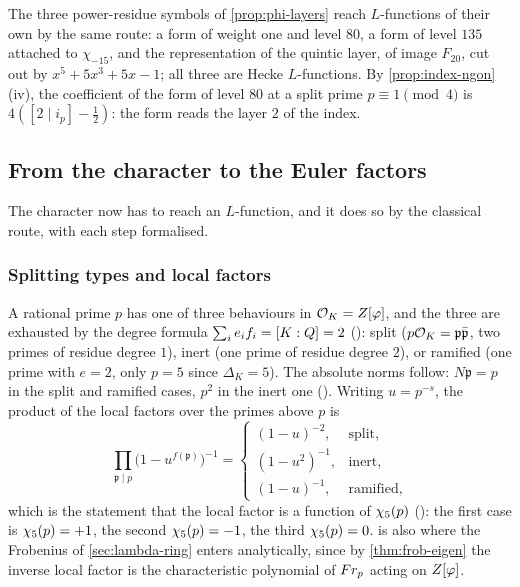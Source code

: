 \begin{remark}\label{rmk:layers-L}
The three power-residue symbols of \cref{prop:phi-layers} reach
$L$-functions of their own by the same route:
a form of weight one and level $80$, a form of level
$135$ attached to $\chi_{-15}$, and the
representation of the quintic layer, of image $F_{20}$,
cut out by $x^5+5x^3+5x-1$; all three are Hecke
$L$-functions.  By \cref{prop:index-ngon}(iv), the
coefficient of the form of level $80$ at a split prime
$p\equiv1\pmod4$ is $4([2\mid i_p]-\tfrac12)$: the form reads
the layer $2$ of the index.
\end{remark}

\subsection{From the character to the Euler factors}\label{sec:dedekind}


The character now has to reach an $L$-function, and it does so by the classical
route, with each step formalised.

\subsubsection{Splitting types and local factors}

A rational prime $p$ has one of three behaviours in $\mathcal{O}_K=Z[\varphi]$, and the three
are exhausted by the degree formula $\sum_ie_if_i=[K:Q]=2$
(): split ($p\mathcal{O}_K=\mathfrak{p}\bar{\mathfrak{p}}$,
two primes of residue degree $1$), inert (one prime of residue degree $2$), or
ramified (one prime with $e=2$, only $p=5$ since $\Delta_K=5$).  The absolute
norms follow: $N\mathfrak{p}=p$ in the split and ramified cases, $p^2$ in the
inert one ().  Writing $u=p^{-s}$, the
product of the local factors over the primes above $p$ is
\begin{equation}\label{eq:local-K}
  \prod_{\mathfrak{p}\mid p}\bigl(1-u^{f(\mathfrak{p})}\bigr)^{-1}
  =\begin{cases}(1-u)^{-2},&\text{split},\\ (1-u^2)^{-1},&\text{inert},\\ (1-u)^{-1},&\text{ramified},\end{cases}
\end{equation}
which is the statement that the local factor is a function of $\chi_5(p)$
(): the first case is $\chi_5(p)=+1$,
the second $\chi_5(p)=-1$, the third $\chi_5(p)=0$.   is also
where the Frobenius of \cref{sec:lambda-ring} enters analytically, since by
\cref{thm:frob-eigen} the inverse local factor is the characteristic polynomial
of $Fr_p$ acting on $Z[\varphi]$.

